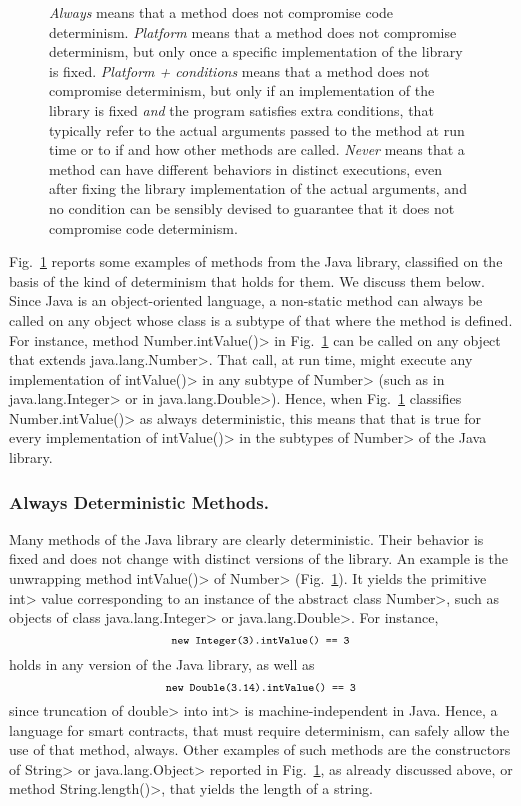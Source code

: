 \begin{figure}[t]
{\emph{Always} means that a method does not compromise code determinism.
\emph{Platform} means that
a method does not compromise determinism, but only once a specific implementation
of the library is fixed. \emph{Platform + conditions} means that a method
does not compromise determinism, but only if an implementation of the library is fixed
\emph{and} the program satisfies extra conditions, that typically refer to
the actual arguments passed to the method at run time or to if and how
other methods are called. \emph{Never} means
that a method can have different behaviors in distinct executions,
even after fixing the library implementation of the actual arguments, and no
condition can be sensibly devised to guarantee that it does not compromise code
determinism.}\label{fig:determinism}
\end{figure}

Fig.~\ref{fig:determinism} reports some examples of methods
from the Java library, classified
on the basis of the kind of determinism that holds for them.
We discuss them below. Since Java is an object-oriented language,
a non-static method can always be called on any object whose class
is a subtype of that where the method is defined. For instance, method \<Number.intValue()> in
Fig.~\ref{fig:determinism} can be called on any object that extends
\<java.lang.Number>. That call, at run time, might
execute any implementation of \<intValue()> in any subtype of \<Number>
(such as in \<java.lang.Integer> or in \<java.lang.Double>).
Hence, when Fig.~\ref{fig:determinism} classifies \<Number.intValue()> as always
deterministic, this means that that is true for every implementation of
\<intValue()> in the subtypes of \<Number> of the Java library.

\subsubsection*{Always Deterministic Methods.}
Many methods of the Java library are clearly deterministic. Their behavior is fixed
and does not change with distinct versions of the library. An example is the unwrapping
method \<intValue()> of \<Number> (Fig.~\ref{fig:determinism}). It yields
the primitive \<int> value corresponding to an instance of the abstract class \<Number>, such
as objects of class \<java.lang.Integer> or \<java.lang.Double>. For instance,
\[
\<new Integer(3).intValue() == 3>
\]
holds in any version of the Java library, as well as
\[
\<new Double(3.14).intValue() == 3>
\]
since truncation of \<double> into \<int> is machine-independent in Java.
Hence, a language for smart contracts, that must require determinism,
can safely allow the use of that method, always. Other examples of such methods
are the constructors of \<String> or \<java.lang.Object>
reported in Fig.~\ref{fig:determinism}, as already discussed above, or method
\<String.length()>, that yields the length of a string.

